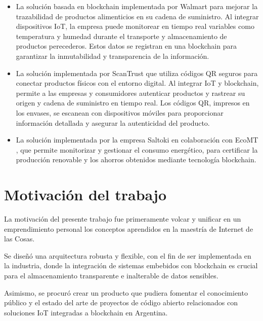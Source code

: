 \begin{itemize}

	\item La solución basada en blockchain implementada por Walmart \citep{iot_usecase_blockchain_walmart} para mejorar la trazabilidad de productos alimenticios en su cadena de suministro. Al integrar dispositivos IoT, la empresa puede monitorear en tiempo real variables como temperatura y humedad durante el transporte y almacenamiento de productos perecederos. Estos datos se registran en una blockchain para garantizar la inmutabilidad y transparencia de la información.
	
	\item La solución implementada por ScanTrust \citep{iot_usecase_blockchain_scantrust} que utiliza códigos QR seguros para conectar productos físicos con el entorno digital. Al integrar IoT y blockchain, permite a las empresas y consumidores autenticar productos y rastrear su origen y cadena de suministro en tiempo real. Los códigos QR, impresos en los envases, se escanean con dispositivos móviles para proporcionar información detallada y asegurar la autenticidad del producto.
		
	\item La solución implementada por la empresa Saltoki en colaboración con EcoMT \citep{iot_usecase_blockchain_saltoki}, que permite monitorizar y gestionar el consumo energético, para certificar la producción renovable y los ahorros obtenidos mediante tecnología blockchain. 
	
	
\end{itemize}




\section{Motivación del trabajo}


La motivación del presente trabajo fue primeramente volcar y unificar en un emprendimiento personal los conceptos aprendidos en la maestría de Internet de las Cosas. 

Se diseñó una arquitectura robusta y flexible, con el fin de ser implementada en la industria, donde la integración de sistemas embebidos con blockchain es crucial para el almacenamiento transparente e inalterable de datos sensibles.

Asimismo, se procuró crear un producto que pudiera fomentar el conocimiento público y el estado del arte de proyectos de código abierto relacionados con soluciones IoT integradas a blockchain en Argentina.


